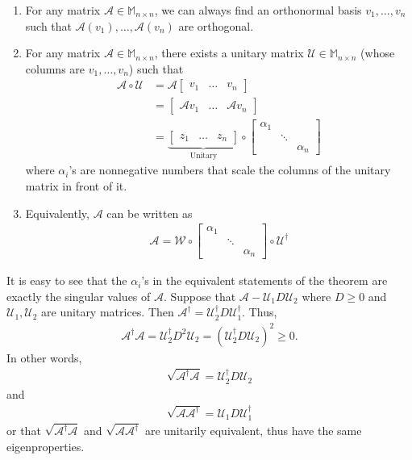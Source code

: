 \documentclass{book}
\theoremstyle{definition}
\newcommand{\Uni}{\mathcal{U}}
\newcommand{\A}{\mathcal{A}}
\begin{document}
\begin{enumerate}
	\item For any matrix $\A \in \mathbb{M}_{n\times n}$, we can always find an orthonormal basis $v_1,\dots,v_n$ such that $\A(v_1),\dots,\A(v_n)$ are orthogonal.
	
	
	\item For any matrix $\A \in \mathbb{M}_{n\times n}$, there exists a unitary matrix $\Uni \in \mathbb{M}_{n\times n}$ (whose columns are $v_1,\dots,v_n$) such that
	\begin{align*}
	\A\circ \Uni &= \A \begin{bmatrix}
	v_1&\dots&v_n
	\end{bmatrix} \\
	&= \begin{bmatrix}
	\A v_1 & \dots & \A v_n
	\end{bmatrix}\\
	&= \underbrace{\begin{bmatrix}
	z_1 & \dots & z_n
	\end{bmatrix}}_{\text{Unitary}}
	\circ 
	\begin{bmatrix}
	\alpha_1 & & \\
	&\ddots & \\
	& & \alpha_n
	\end{bmatrix}
	\end{align*}
	where $\alpha_i$'s are nonnegative numbers that scale the columns of the unitary matrix in front of it.
	
	
	\item Equivalently, $\A$ can be written as
	\begin{align}
	\A = \mathcal{W} \circ \begin{bmatrix}
	\alpha_1 & & \\
	&\ddots & \\
	& & \alpha_n
	\end{bmatrix} \circ \Uni^\dagger
	\end{align}
\end{enumerate}



It is easy to see that the $\alpha_i$'s in the equivalent statements of the theorem are exactly the singular values of $\A$. Suppose that $\A - \Uni_1 D \Uni_2$ where $D \geq 0$ and $\Uni_1, \Uni_2$ are unitary matrices. Then $\A^\dagger = \Uni_2^\dagger D \Uni_1^\dagger$. Thus, 
\begin{align*}
\A^\dagger \A = \Uni_2^\dagger D^2 \Uni_2 = (\Uni_2^\dagger D \Uni_2)^2 \geq 0.
\end{align*}
In other words,
\begin{align*}
\sqrt{\A^\dagger \A} = \Uni_2^\dagger D \Uni_2
\end{align*}
and
\begin{align*}
\sqrt{\A \A^\dagger} = \Uni_1 D \Uni_1^\dagger
\end{align*}
or that $\sqrt{\A^\dagger \A}$ and $\sqrt{\A \A^\dagger}$ are unitarily equivalent, thus have the same eigenproperties. 
\end{document}

